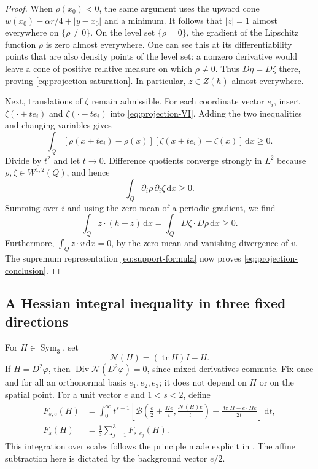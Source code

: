 \documentclass[11pt,a4paper,reqno]{amsart}
\theoremstyle{plain}
\theoremstyle{remark}
\numberwithin{equation}{section}
\newcommand{\dd}{\,\mathrm d}
\DeclareMathOperator{\tr}{tr}
\DeclareMathOperator{\Div}{Div}
\DeclareMathOperator{\Sym}{Sym}
\begin{document}
\begin{proof}
When $\rho(x_0)<0$, the same argument uses the upward cone $w(x_0)-\alpha r/4+|y-x_0|$ and a minimum. It follows that $|z|=1$ almost everywhere on $\{\rho\ne0\}$. On the level set $\{\rho=0\}$, the gradient of the Lipschitz function $\rho$ is zero almost everywhere. One can see this at its differentiability points that are also density points of the level set: a nonzero derivative would leave a cone of positive relative measure on which $\rho\ne0$. Thus $D\eta=D\zeta$ there, proving \eqref{eq:projection-saturation}. In particular, $z\in Z(h)$ almost everywhere.

Next, translations of $\zeta$ remain admissible. For each coordinate vector $e_i$, insert $\zeta(\cdot+te_i)$ and $\zeta(\cdot-te_i)$ into \eqref{eq:projection-VI}. Adding the two inequalities and changing variables gives
\[
 \int_Q[\rho(x+te_i)-\rho(x)]
        [\zeta(x+te_i)-\zeta(x)]\dd x\ge0.
\]
Divide by $t^2$ and let $t\to0$. Difference quotients converge strongly in $L^2$ because $\rho,\zeta\in W^{1,2}(Q)$, and hence
\[
 \int_Q\partial_i\rho\,\partial_i\zeta\dd x\ge0.
\]
Summing over $i$ and using the zero mean of a periodic gradient, we find
\[
 \int_Q z\cdot(h-z)\dd x
 =\int_QD\zeta\cdot D\rho\dd x\ge0.
\]
Furthermore, $\int_Qz\cdot v\dd x=0$, by the zero mean and vanishing divergence of $v$. The supremum representation \eqref{eq:support-formula} now proves \eqref{eq:projection-conclusion}.
\end{proof}

\subsection{A Hessian integral inequality in three fixed directions}
For $H\in\Sym_3$, set
\[
 \mathcal N(H)=(\tr H)I-H.
\]
If $H=D^2\varphi$, then $\Div\mathcal N(D^2\varphi)=0$, since mixed derivatives commute. Fix once and for all an orthonormal basis $e_1,e_2,e_3$; it does not depend on $H$ or on the spatial point. For a unit vector $e$ and $1<s<2$, define
\begin{equation}\label{eq:calibration-definition}
 \begin{split}
 F_{s,e}(H)&=\int_0^\infty t^{s-1}
 \left[\mathcal B\left(\frac e2+\frac{He}{t},
                            \frac{\mathcal N(H)e}{t}\right)
       -\frac{\tr H-e\cdot He}{2t}\right]\dd t,\\
 F_s(H)&=\frac13\sum_{j=1}^3F_{s,e_j}(H).
 \end{split}
\end{equation}
This integration over scales follows the principle made explicit in \cite[equations~(1.2a)--(1.2b)]{BaernsteinMS1999}. The affine subtraction here is dictated by the background vector $e/2$.
\end{document}
